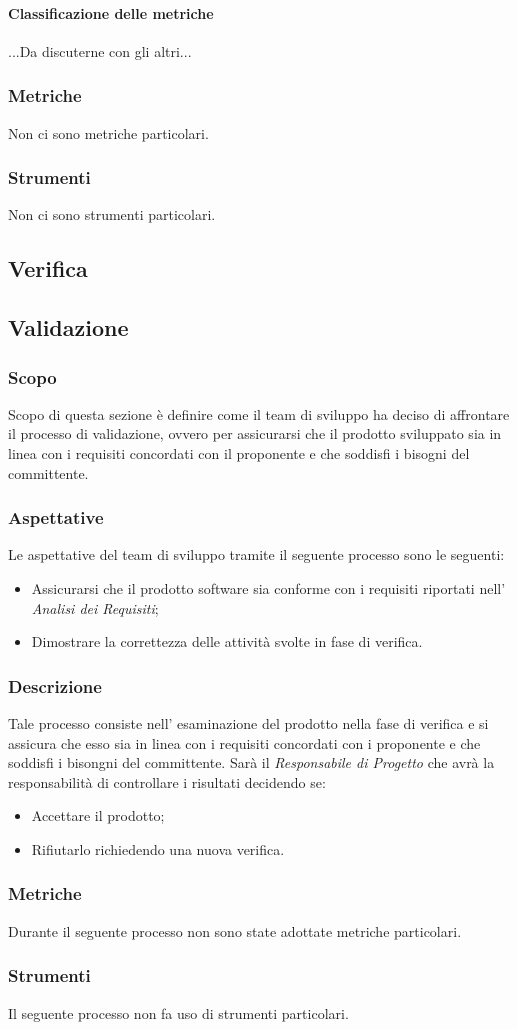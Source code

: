 \paragraph{Classificazione delle metriche}
...Da discuterne con gli altri...
\subsubsection{Metriche}
Non ci sono metriche particolari.
\subsubsection{Strumenti}
Non ci sono strumenti particolari.

\subsection{Verifica}

\subsection{Validazione}\label{subsection: validazione}
\subsubsection{Scopo}
Scopo di questa sezione è definire come il team di sviluppo ha deciso di affrontare il processo di validazione, ovvero per assicurarsi che il prodotto sviluppato sia in linea con i requisiti concordati con il proponente e che soddisfi i bisogni del committente.
\subsubsection{Aspettative}
Le aspettative del team di sviluppo tramite il seguente processo sono le seguenti: 
\begin{itemize}
    \item Assicurarsi che il prodotto software sia conforme con i requisiti riportati nell' \textit{Analisi dei Requisiti};
    \item  Dimostrare la correttezza delle attività svolte in fase di verifica.
\end{itemize}
\subsubsection{Descrizione}
Tale processo consiste nell' esaminazione del prodotto nella fase di verifica e si assicura che esso sia in linea con i requisiti concordati con i proponente e che soddisfi i bisongni del committente.
Sarà il \textit{Responsabile di Progetto} che avrà la responsabilità di controllare i risultati decidendo se:
\begin{itemize}
    \item Accettare il prodotto;
    \item Rifiutarlo richiedendo una nuova verifica.
\end{itemize}    
\subsubsection{Metriche}
Durante il seguente processo non sono state adottate metriche particolari.
\subsubsection{Strumenti}
Il seguente processo non fa uso di strumenti particolari.


